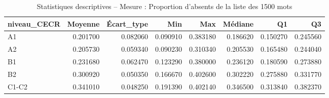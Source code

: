 \begin{table}
\caption{Statistiques descriptives – Mesure : Proportion d'absents de la liste des 1500 mots}
\label{tab:stats_PA_SUBTLEX_1500}
\begin{tabular}{lrrrrrrr}
\toprule
niveau_CECR & Moyenne & Écart_type & Min & Max & Médiane & Q1 & Q3 \\
\midrule
A1 & 0.201700 & 0.082060 & 0.090910 & 0.383180 & 0.186620 & 0.150270 & 0.245560 \\
A2 & 0.205730 & 0.059340 & 0.090230 & 0.310340 & 0.205530 & 0.165480 & 0.244040 \\
B1 & 0.231680 & 0.062470 & 0.123290 & 0.380000 & 0.236120 & 0.180590 & 0.273880 \\
B2 & 0.300920 & 0.050350 & 0.166670 & 0.402600 & 0.302220 & 0.275880 & 0.331770 \\
C1-C2 & 0.341010 & 0.048250 & 0.191390 & 0.402140 & 0.346500 & 0.313840 & 0.382370 \\
\bottomrule
\end{tabular}
\end{table}
